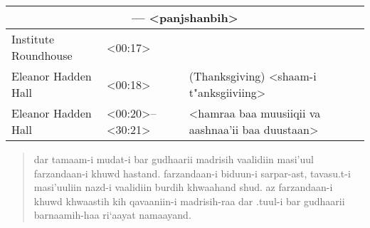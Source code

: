 \documentclass[12pt]{arabart}
\begin{document}

\setfarsi
\novocalize

\begin{longtable}[c]{p{1.75in}|p{1.1in}|p{2.75in}}
\multicolumn{3}{c}{ --- <panjshanbih>} \\
\hline
Institute Roundhouse & <00:17> &  \\
Eleanor Hadden Hall & <00:18> & \hfill (Thanksgiving) <shaam-i t"anksgiiviing> \\
Eleanor Hadden Hall & <00:20>--<30:21> & \hfill <hamraa baa muusiiqii va aashnaa'ii baa duustaan> \\
\hline
\end{longtable}

\begin{quote}
\begin{RLtext}
\noindent
dar tamaam-i mudat-i bar gudhaarii madrisih vaalidiin masi'uul
farzandaan-i khuwd hastand.  farzandaan-i biduun-i sarpar-ast,
tavasu.t-i masi'uuliin nazd-i vaalidiin burdih khwaahand shud.  az
farzandaan-i khuwd khwaastih kih qavaaniin-i madrisih-raa dar .tuul-i
bar gudhaarii barnaamih-haa ri`aayat namaayand.
\end{RLtext}
\end{quote}
\end{document}
